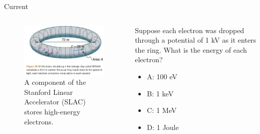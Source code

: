 \documentclass{beamer}
\begin{document}
\begin{frame}{Current}
\begin{columns}[T]
\begin{column}{0.5\textwidth}
\begin{figure}
\centering
\includegraphics[width=\textwidth]{figures/SPEAR.png}
\caption{\label{fig:SLAC} A component of the Stanford Linear Accelerator (SLAC) stores high-energy electrons.}
\end{figure}
\end{column}
\begin{column}{0.5\textwidth}
\small
Suppose each electron was dropped through a potential of 1 kV as it enters the ring.  What is the energy of each electron?
\begin{itemize}
\item A: 100 eV
\item B: 1 keV
\item C: 1 MeV
\item D: 1 Joule
\end{itemize}
\end{column}
\end{columns}
\end{frame}
\end{document}
